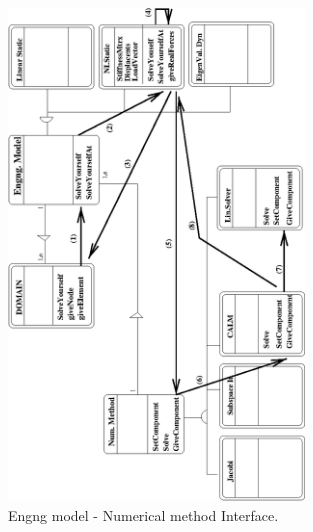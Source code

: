 \documentclass[a4paper]{article}
\begin{document}
\begin{figure}[tb]
\else
\centerline{\includegraphics[angle=270,width=0.7\textwidth]{struct2.eps}}
\fi
\caption{Engng model - Numerical method Interface.}
\label{engngNummet1fig}
\end{figure}
\end{document}
